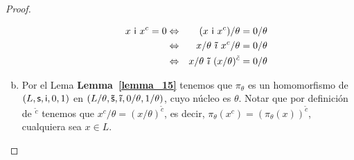 \begin{proof}
\begin{enumerate}[a)]
\begin{itemize}
          \begin{eqnarray*}
            x \ \IN \ x^{c} = 0 &\Leftrightarrow& (x \ \IN \ x^{c})/\theta = 0/\theta \\
            &\Leftrightarrow& x/\theta \ \mathsf{\tilde{\imath}} \ x^{c}/\theta = 0/\theta \\
            &\Leftrightarrow& x/\theta \ \mathsf{\tilde{\imath}} \ (x/\theta)^{\tilde{c}} = 0/\theta
          \end{eqnarray*}
      \end{itemize}
      \item Por el Lema \textbf{Lemma~\ref{lemma_15}} tenemos que $\pi_{\theta}$ es un homomorfismo de $(L, \mathsf{s}, \mathsf{i}, 0, 1)$ en
      $(L/\theta, \mathsf{\tilde{s}}, \mathsf{\tilde{\imath}}, 0/\theta, \linebreak 1/\theta)$, cuyo núcleo es $\theta$.
      Notar que por definición de $^{\tilde{c}}$ tenemos que $x^{c}/\theta = (x/\theta)^{\tilde{c}}$, es decir,
      $\pi_{\theta}(x^{c}) = (\pi_{\theta}(x))^{\tilde{c}}$, cualquiera sea $x \in L$.
    \end{enumerate}
  \end{proof}

